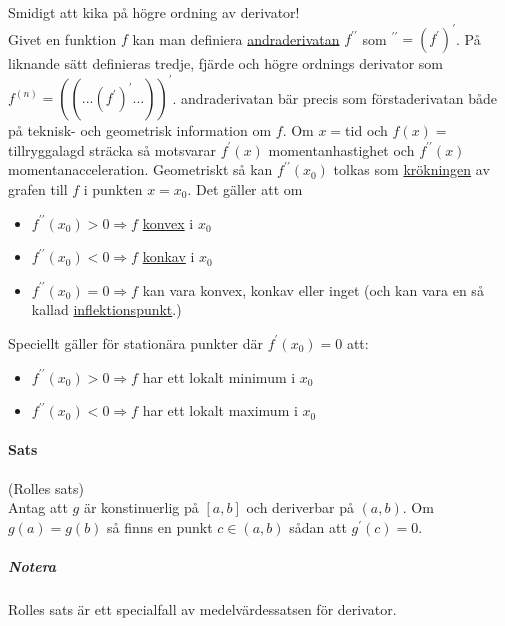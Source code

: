 Smidigt att kika på högre ordning av derivator!\\
Givet en funktion $f$ kan man definiera \underline{andraderivatan} $f^{\prime\prime}$ som $^{\prime\prime}=(f^\prime)^\prime$.
På liknande sätt definieras tredje, fjärde och högre ordnings derivator som $f^{(n)}=((...(f^\prime)^\prime...))^\prime$.
andraderivatan bär precis som förstaderivatan både på teknisk- och geometrisk information om $f$.
Om $x=$tid och $f(x)=$tillryggalagd sträcka så motsvarar $f^\prime(x)$ momentanhastighet och $f^{\prime\prime}(x)$ momentanacceleration.
Geometriskt så kan $f^{\prime\prime}(x_0)$ tolkas som \underline{krökningen} av grafen till $f$ i punkten $x=x_0$.
Det gäller att om
\begin{itemize}
    \item $f^{\prime\prime}(x_0)>0\Rightarrow f$ \underline{konvex} i $x_0$
    \item $f^{\prime\prime}(x_0)<0\Rightarrow f$ \underline{konkav} i $x_0$
    \item $f^{\prime\prime}(x_0)=0\Rightarrow f$ kan vara konvex, konkav eller inget (och kan vara en så kallad \underline{inflektionspunkt}.)
\end{itemize}

Speciellt gäller för stationära punkter där $f^\prime(x_0)=0$ att:
\begin{itemize}
    \item $f^{\prime\prime}(x_0)>0\Rightarrow f$ har ett lokalt minimum i $x_0$
    \item $f^{\prime\prime}(x_0)<0\Rightarrow f$ har ett lokalt maximum i $x_0$
\end{itemize}

\paragraph{Sats} (Rolles sats)\\
Antag att $g$ är konstinuerlig på $[a,b]$ och deriverbar på $(a,b)$.
Om $g(a)=g(b)$ så finns en punkt $c\in(a,b)$ sådan att $g^\prime(c)=0$.
\subparagraph{Notera} Rolles sats är ett specialfall av medelvärdessatsen för derivator.

